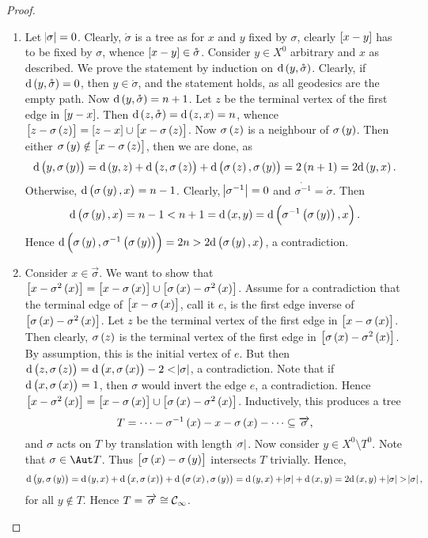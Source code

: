 \begin{proof}
\hfill
\begin{enumerate}
\item Let $ \abs{\sigma} = 0 $. Clearly, $ \mathring{\sigma} $ is a tree as for $ x $ and $ y $ fixed by $ \sigma $, clearly $ \sbr{x - y} $ has to be fixed by $ \sigma $, whence $ \sbr{x - y} \in \mathring{\sigma} $. Consider $ y \in X^0 $ arbitrary and $ x $ as described. We prove the statement by induction on $ \d\br{y, \mathring{\sigma}} $. Clearly, if $ \d\br{y, \mathring{\sigma}} = 0 $, then $ y \in \mathring{\sigma} $, and the statement holds, as all geodesics are the empty path. Now $ \d\br{y, \mathring{\sigma}} = n + 1 $. Let $ z $ be the terminal vertex of the first edge in $ \sbr{y - x} $. Then $ \d\br{z, \mathring{\sigma}} = \d\br{z, x} = n $, whence $ \sbr{z - \sigma\br{z}} = \sbr{z - x} \cup \sbr{x - \sigma\br{z}} $. Now $ \sigma\br{z} $ is a neighbour of $ \sigma\br{y} $. Then either $ \sigma\br{y} \notin \sbr{x - \sigma\br{z}} $, then we are done, as
$$ \d\br{y, \sigma\br{y}} = \d\br{y, z} + \d\br{z, \sigma\br{z}} + \d\br{\sigma\br{z}, \sigma\br{y}} = 2\br{n + 1} = 2\d\br{y, x}. $$
Otherwise, $ \d\br{\sigma\br{y}, x} = n - 1 $. Clearly, $ \abs{\sigma^{-1}} = 0 $ and $ \mathring{\sigma^{-1}} = \mathring{\sigma} $. Then
$$ \d\br{\sigma\br{y}, x} = n - 1 < n + 1 = \d\br{x, y} = \d\br{\sigma^{-1}\br{\sigma\br{y}}, x}. $$
Hence $ \d\br{\sigma\br{y}, \sigma^{-1}\br{\sigma\br{y}}} = 2n > 2\d\br{\sigma\br{y}, x} $, a contradiction.
\item Consider $ x \in \overrightarrow{\sigma} $. We want to show that $ \sbr{x - \sigma^2\br{x}} = \sbr{x - \sigma\br{x}} \cup \sbr{\sigma\br{x} - \sigma^2\br{x}} $. Assume for a contradiction that the terminal edge of $ \sbr{x - \sigma\br{x}} $, call it $ e $, is the first edge inverse of $ \sbr{\sigma\br{x} - \sigma^2\br{x}} $. Let $ z $ be the terminal vertex of the first edge in $ \sbr{x - \sigma\br{x}} $. Then clearly, $ \sigma\br{z} $ is the terminal vertex of the first edge in $ \sbr{\sigma\br{x} - \sigma^2\br{x}} $. By assumption, this is the initial vertex of $ e $. But then $ \d\br{z, \sigma\br{z}} = \d\br{x, \sigma\br{x}} - 2 < \abs{\sigma} $, a contradiction. Note that if $ \d\br{x, \sigma\br{x}} = 1 $, then $ \sigma $ would invert the edge $ e $, a contradiction. Hence $ \sbr{x - \sigma^2\br{x}} = \sbr{x - \sigma\br{x}} \cup \sbr{\sigma\br{x} - \sigma^2\br{x}} $. Inductively, this produces a tree
$$ T = \dots - \sigma^{-1}\br{x} - x - \sigma\br{x} - \dots \subseteq \overrightarrow{\sigma}, $$
and $ \sigma $ acts on $ T $ by translation with length $ \abs{\sigma} $. Now consider $ y \in X^0 \setminus T^0 $. Note that $ \sigma \in \Aut T $. Thus $ \sbr{\sigma\br{x} - \sigma\br{y}} $ intersects $ T $ trivially. Hence,
$$ \d\br{y, \sigma\br{y}} = \d\br{y, x} + \d\br{x, \sigma\br{x}} + \d\br{\sigma\br{x}, \sigma\br{y}} = \d\br{y, x} + \abs{\sigma} + \d\br{x, y} = 2\d\br{x, y} + \abs{\sigma} > \abs{\sigma}, $$
for all $ y \notin T $. Hence $ T = \overrightarrow{\sigma} \cong \mathcal{C}_\infty $.
\end{enumerate}
\end{proof}

